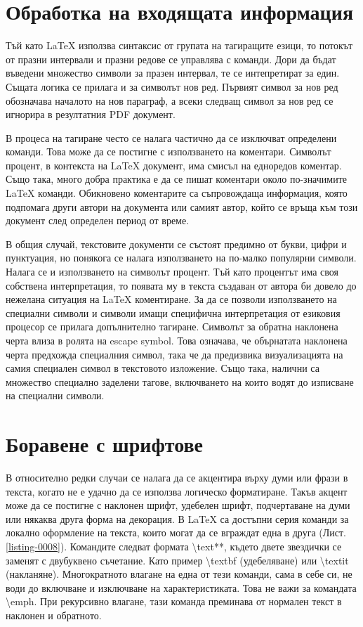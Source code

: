 \section{Обработка на входящата информация}

Тъй като LaTeX използва синтаксис от групата на тагиращите езици, то потокът от празни интервали и празни редове се управлява с команди. Дори да бъдат въведени множество символи за празен интервал, те се интепретират за един. Същата логика се прилага и за символът нов ред. Първият символ за нов ред обозначава началото на нов параграф, а всеки следващ символ за нов ред се игнорира в резултатния PDF документ. 

В процеса на тагиране често се налага частично да се изключват определени команди. Това може да се постигне с използването на коментари. Символът процент, в контекста на LaTeX документ, има смисъл на едноредов коментар. Също така, много добра практика е да се пишат коментари около по-значимите LaTeX команди. Обикновено коментарите са съпровождаща информация, която подпомага други автори на документа или самият автор, който се връща към този документ след определен период от време. 

В общия случай, текстовите документи се състоят предимно от букви, цифри и пунктуация, но понякога се налага използването на по-малко популярни символи. Налага се и използването на символът процент. Тъй като процентът има своя собствена интерпретация, то появата му в текста създаван от автора би довело до нежелана ситуация на LaTeX коментиране. За да се позволи използването на специални символи и символи имащи специфична интерпретация от езиковия процесор се прилага допълнително тагиране. Символът за обратна наклонена черта влиза в ролята на escape symbol. Това означава, че обърнатата наклонена черта предхожда специалния символ, така че да предизвика визуализацията на самия специален символ в текстовото изложение. Също така, налични са множество специално заделени тагове, включването на които водят до изписване на специални символи. 

\section{Боравене с шрифтове}

В относително редки случаи се налага да се акцентира върху думи или фрази в текста, когато не е удачно да се използва логическо форматиране. Такъв акцент може да се постигне с наклонен шрифт, удебелен шрифт, подчертаване на думи или някаква друга форма на декорация. В LaTeX са достъпни серия команди за локално оформление на текста, които могат да се вграждат една в друга (Лист. \ref{listing-0008}). Командите следват формата \textbackslash text**, където двете звездички се заменят с двубуквено съчетание. Като пример \textbackslash textbf (удебеляване) или \textbackslash textit (накланяне). Многократното влагане на една от тези команди, сама в себе си, не води до включване и изключване на характеристиката. Това не важи за командата \textbackslash emph. При рекурсивно влагане, тази команда преминава от нормален текст в наклонен и обратното. 

